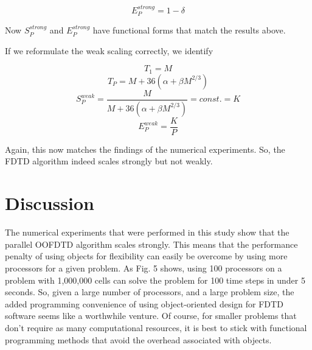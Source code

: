 \documentclass{article}
\begin{document}
$$E_P^{strong} = 1-\delta$$

Now $S_P^{strong}$ and $E_P^{strong}$ have functional forms that match the results above. 

If we reformulate the weak scaling correctly, we identify

$$T_1 = M$$
$$T_P = M + 36(\alpha + \beta M^{2/3})$$
$$S_P^{weak} = \frac{M}{M + 36(\alpha + \beta M^{2/3})} = const. = K$$
$$E_P^{weak} = \frac{K}{P}$$

Again, this now matches the findings of the numerical experiments. So, the FDTD algorithm indeed scales strongly but not weakly. 

\section{Discussion}

The numerical experiments that were performed in this study show that the parallel OOFDTD algorithm scales strongly. This means that the performance penalty of using objects for flexibility can easily be overcome by using more processors for a given problem. As Fig. 5 shows, using 100 processors on a problem with 1,000,000 cells can solve the problem for 100 time steps in under 5 seconds. So, given a large number of processors, and a large problem size, the added programming convenience of using object-oriented design for FDTD software seems like a worthwhile venture. Of course, for smaller problems that don't require as many computational resources, it is best to stick with functional programming methods that avoid the overhead associated with objects. 

% 
% 
\nocite{*}
\printbibliography
\end{document}
